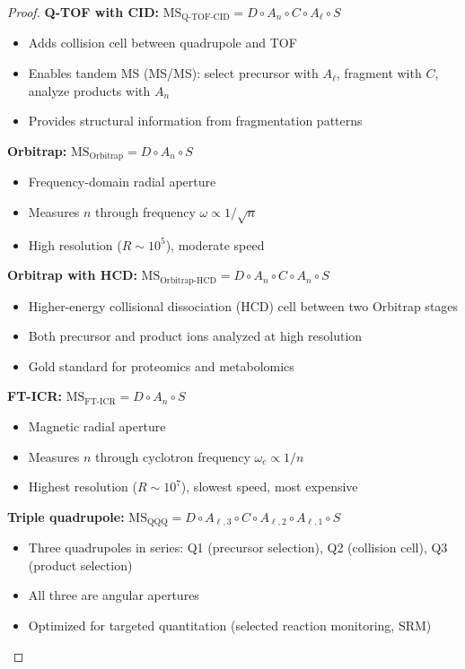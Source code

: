 \begin{proof}
\textbf{Q-TOF with CID:} $\text{MS}_{\text{Q-TOF-CID}} = D \circ A_n \circ C \circ A_\ell \circ S$
\begin{itemize}
    \item Adds collision cell between quadrupole and TOF
    \item Enables tandem MS (MS/MS): select precursor with $A_\ell$, fragment with $C$, analyze products with $A_n$
    \item Provides structural information from fragmentation patterns
\end{itemize}

\textbf{Orbitrap:} $\text{MS}_{\text{Orbitrap}} = D \circ A_n \circ S$
\begin{itemize}
    \item Frequency-domain radial aperture
    \item Measures $n$ through frequency $\omega \propto 1/\sqrt{n}$
    \item High resolution ($R \sim 10^5$), moderate speed
\end{itemize}

\textbf{Orbitrap with HCD:} $\text{MS}_{\text{Orbitrap-HCD}} = D \circ A_n \circ C \circ A_n \circ S$
\begin{itemize}
    \item Higher-energy collisional dissociation (HCD) cell between two Orbitrap stages
    \item Both precursor and product ions analyzed at high resolution
    \item Gold standard for proteomics and metabolomics
\end{itemize}

\textbf{FT-ICR:} $\text{MS}_{\text{FT-ICR}} = D \circ A_n \circ S$
\begin{itemize}
    \item Magnetic radial aperture
    \item Measures $n$ through cyclotron frequency $\omega_c \propto 1/n$
    \item Highest resolution ($R \sim 10^7$), slowest speed, most expensive
\end{itemize}

\textbf{Triple quadrupole:} $\text{MS}_{\text{QQQ}} = D \circ A_{\ell,3} \circ C \circ A_{\ell,2} \circ A_{\ell,1} \circ S$
\begin{itemize}
    \item Three quadrupoles in series: Q1 (precursor selection), Q2 (collision cell), Q3 (product selection)
    \item All three are angular apertures
    \item Optimized for targeted quantitation (selected reaction monitoring, SRM)
\end{itemize}


\end{proof}
